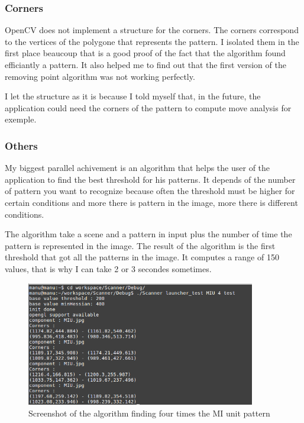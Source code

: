 	\subsubsection{Corners}
	\par OpenCV does not implement a structure for the corners. The corners correspond to the vertices of the polygone that represents the pattern. I isolated them in the first place beaucoup that is a good proof of the fact that the algorithm found efficiantly a pattern. It also helped me to find out that the first version of the removing point algorithm was not working perfectly.
	\par I let the structure as it is because I told myself that, in the future, the application could need the corners of the pattern to compute move analysis for exemple. 	
	
	\subsubsection{Others}
	
	\par My biggest parallel achivement is an algorithm that helps the user of the application to find the best threshold for his patterns. It depends of the number of pattern you want to recognize because often the threshold must be higher for certain conditions and more there is pattern in the image, more there is different conditions. 
	\par The algorithm take a scene and a pattern in input plus the number of time the pattern is represented in the image. The result of the algorithm is the first threshold that got all the patterns in the image. It computes a range of 150 values, that is why I can take 2 or 3 secondes sometimes.
	
	\begin{figure}[h]
		\begin{center}
			\includegraphics[width=10cm]{images_not_compressed/tester.png}
			\caption{Screenshot of the algorithm finding four times the MI unit pattern}
		\end{center}
	\end{figure}	
	
